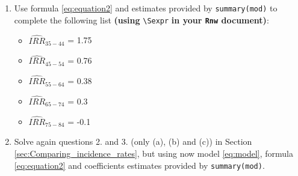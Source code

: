 \documentclass[10pt,a4paper,twoside]{article}\usepackage[]{graphicx}\usepackage[]{xcolor}
\newcommand{\Robject}[1]{\texttt{#1}}
\begin{document}
\begin{enumerate}
\item Use formula \ref{eq:equation2} and estimates provided by \verb+summary(mod)+ to complete the following list \textbf{(using} \verb+\Sexpr+ \textbf{in your \Robject{Rnw} document)}:
\begin{itemize}
    \item $\widehat{IRR}_{35-44}$ = 1.75
    \item $\widehat{IRR}_{45-54}$ = 0.76
    \item $\widehat{IRR}_{55-64}$ = 0.38
    \item $\widehat{IRR}_{65-74}$ = 0.3
    \item $\widehat{IRR}_{75-84}$ = -0.1
\end{itemize}

\item Solve again questions 2. and 3. (only (a), (b) and (c)) in Section \ref{sec:Comparing_incidence_rates}, but using now model \eqref{eq:model}, formula \ref{eq:equation2} and coefficients estimates provided by \verb+summary(mod)+.


\end{enumerate}
\end{document}
